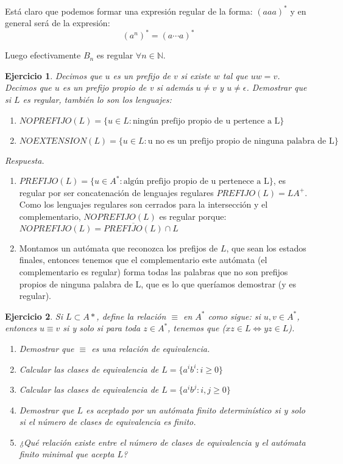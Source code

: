 \documentclass[11pt]{article}
\theoremstyle{ejercicio-style}
\newtheorem{ejer}{Ejercicio}
\begin{document}
Está claro que podemos formar una expresión regular de la forma: $(aaa)^*$ y en general será de la expresión: $$ (a^n)^* = (a \dotsb a)^* $$

Luego efectivamente $B_n$ es regular $\forall n \in \mathbb{N}$.

\begin{ejer}
Decimos que $u$ es un prefijo de $v$ si existe $w$ tal que $uw = v$. Decimos que $u$ es un prefijo propio de v si además $u \neq v$ y $u \neq \epsilon$. Demostrar que si $L$ es regular, también lo son los lenguajes:
\begin{enumerate}
	\item $NOPREFIJO(L) = \{ u \in L : \text{ningún prefijo propio de u pertence a L}\}$
	\item $NOEXTENSION(L) = \{ u \in L : \text{u no es un prefijo propio de ninguna palabra de L} \}$
\end{enumerate}
\end{ejer}

\emph{Respuesta.}
\begin{enumerate}
	\item $PREFIJO(L)= \{ u \in A^* : \text{algún prefijo propio de u pertenece a L}\}$, es regular por ser concatenación de lenguajes regulares $PREFIJO(L)=LA^+$. Como los lenguajes regulares son cerrados para la intersección y el complementario, $NOPREFIJO(L)$ es regular porque: $NOPREFIJO(L) = \overline{PREFIJO(L)} \cap L$
	\item Montamos un autómata que reconozca los prefijos de $L$, que sean los estados finales, entonces tenemos que el complementario este autómata (el complementario es regular) forma todas las palabras que no son prefijos propios de ninguna palabra de L, que es lo que queríamos demostrar (y es regular).
\end{enumerate}


\begin{ejer}
Si $L \subset A*$, define la relación $\equiv$ en $A^*$ como sigue: si $u,v \in A^*$, entonces $u \equiv v$ si y solo si para toda $z \in A^*$, tenemos que ($ xz \in L \iff yz \in L$).
\begin{enumerate}
	\item Demostrar que $\equiv$ es una relación de equivalencia.
	\item Calcular las clases de equivalencia de $L = \{ a^ib^i : i \geq 0 \} $
	\item Calcular las clases de equivalencia de $L = \{ a^ib^j : i, j \geq 0 \} $
	\item Demostrar que $L$ es aceptado por un autómata finito determinístico si y solo si el número de clases de equivalencia es finito.
	\item ¿Qué relación existe entre el número de clases de equivalencia y el autómata finito minimal que acepta $L$?
\end{enumerate}
\end{ejer}
\end{document}
